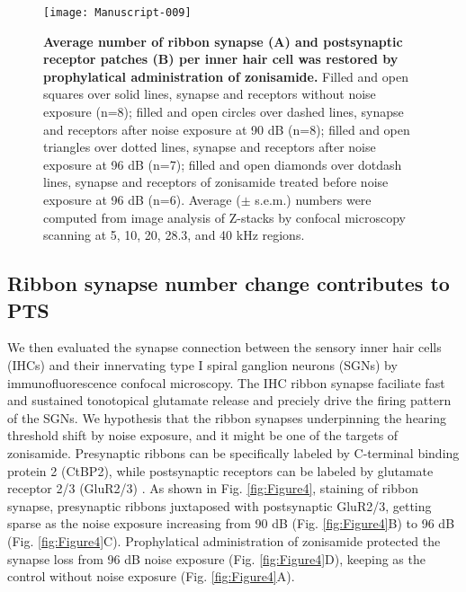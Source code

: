 \documentclass[11pt]{article}
\begin{document}
\begin{figure}[ht!]
\centering
\texttt{[image: Manuscript-009]}
\caption{{\bf {Average number of ribbon synapse (A) and postsynaptic receptor patches (B) per inner hair cell was restored by prophylatical administration of zonisamide.}}  Filled and open squares over solid lines, synapse and receptors without noise exposure (n=8); filled  and open circles over dashed lines, synapse and receptors after noise exposure at 90 dB (n=8); filled  and open triangles over dotted lines, synapse and receptors after noise exposure at 96 dB (n=7); filled  and open diamonds over dotdash lines, synapse and receptors of zonisamide treated before noise exposure at 96 dB (n=6). Average ($\pm$ s.e.m.) numbers were computed from image analysis of Z-stacks by confocal microscopy scanning at 5, 10, 20, 28.3, and 40 kHz regions.}
\label{fig:Figure5}
\end{figure}


\subsection {Ribbon synapse number change contributes to PTS}
We then evaluated the synapse connection between the sensory inner hair cells (IHCs) and their innervating type I spiral ganglion neurons (SGNs) by immunofluorescence confocal microscopy. The IHC ribbon synapse faciliate fast and sustained tonotopical glutamate release and preciely drive the firing pattern of the SGNs. We hypothesis that the ribbon synapses underpinning the hearing threshold shift by noise exposure, and it might be one of the targets of zonisamide. Presynaptic ribbons can be specifically labeled by C-terminal binding protein 2 (CtBP2), while postsynaptic receptors can be labeled by glutamate receptor 2/3 (GluR2/3) \cite{Khimich2005,Liberman2011}. As shown in Fig. \ref{fig:Figure4}, staining of ribbon synapse, presynaptic ribbons juxtaposed with postsynaptic GluR2/3, getting sparse as the noise exposure increasing from 90 dB (Fig. \ref{fig:Figure4}B) to 96 dB (Fig. \ref{fig:Figure4}C). Prophylatical administration of zonisamide protected the synapse loss from 96 dB noise exposure (Fig. \ref{fig:Figure4}D), keeping as the control without noise exposure (Fig. \ref{fig:Figure4}A). 
\end{document}
